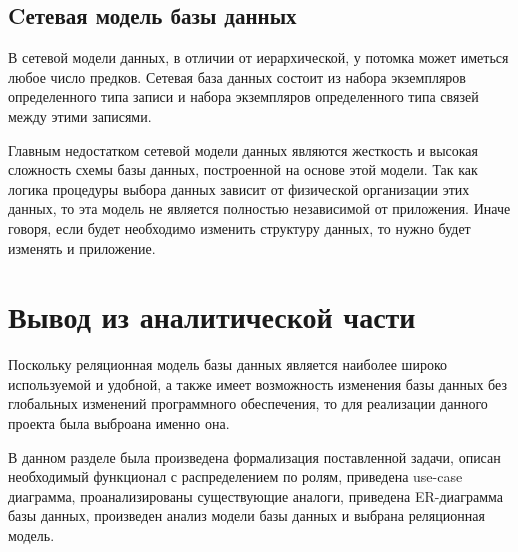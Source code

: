 
\subsection{Cетевая модель базы данных}
В сетевой модели данных, в отличии от иерархической, у потомка может иметься любое число предков. Сетевая база данных состоит из набора экземпляров определенного типа записи и набора экземпляров определенного типа связей между этими записями.

Главным недостатком сетевой модели данных являются жесткость и высокая сложность схемы базы данных, построенной на основе этой модели. Так как логика процедуры выбора данных зависит от физической организации этих данных, то эта модель не является полностью независимой от приложения. Иначе говоря, если будет необходимо изменить структуру данных, то нужно будет изменять и приложение.


\section*{Вывод из аналитической части}
Поскольку реляционная модель базы данных является наиболее широко используемой и удобной, а также имеет возможность изменения базы данных без глобальных изменений программного обеспечения, то для реализации данного проекта была выброана именно она.

В данном разделе была произведена формализация поставленной задачи, описан необходимый функционал с распределением по ролям, приведена use-case диаграмма, проанализированы существующие аналоги, приведена \newline ER-диаграмма базы данных, произведен анализ модели базы данных и выбрана реляционная модель.